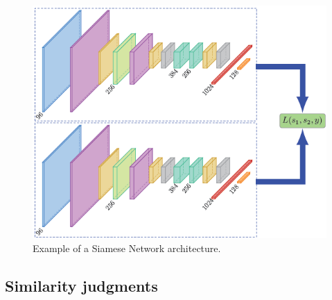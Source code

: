 \documentclass[conference]{IEEEtran}
\begin{document}
				\begin{figure}[!ht]
					\centerline{\includegraphics[width=\linewidth]{imgs/siamese_architecture.png}}
					\caption{Example of a Siamese Network architecture.}
					\label{fig:6}
				\end{figure}
		
		\subsection{Similarity judgments}
			
\end{document}
